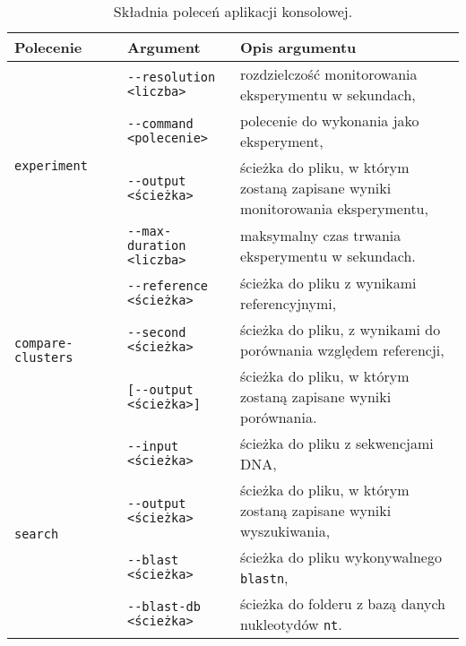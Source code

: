                 \begin{table}[!h] \centering
                    \caption{Składnia poleceń aplikacji konsolowej.}\label{Table:ConsoleCommandsSyntax}

                    \begin{tabular}{| p{0.25\linewidth} | >{\footnotesize}p{0.25\linewidth} | >{\footnotesize}p{0.5\linewidth} | } 
                        \hline
                        \textbf{Polecenie}     & \textbf{\normalsize Argument}    & \textbf{\normalsize Opis argumentu} \\ \hline\hline

                        \multirow{4}{*}{\texttt{experiment}}  & \texttt{-\phantom{}-resolution <liczba>}   & rozdzielczość monitorowania eksperymentu w sekundach, \\
                                                              & \texttt{-\phantom{}-command <polecenie>}   & polecenie do wykonania jako eksperyment, \\
                                                              & \texttt{-\phantom{}-output <ścieżka>}      & ścieżka do pliku, w którym zostaną zapisane wyniki monitorowania eksperymentu, \\
                                                              & \texttt{-\phantom{}-max-duration <liczba>} & maksymalny czas trwania eksperymentu w sekundach. \\ \hline

                            

                        \multirow{3}{*}{\texttt{compare-clusters}}  & \texttt{-\phantom{}-reference <ścieżka>} & ścieżka do pliku z wynikami referencyjnymi, \\
                                                                    & \texttt{-\phantom{}-second <ścieżka>}    & ścieżka do pliku, z wynikami do porównania względem referencji, \\
                                                                    & \texttt{[-\phantom{}-output <ścieżka>]}  & ścieżka do pliku, w którym zostaną zapisane wyniki porównania. \\ \hline

                        \multirow{4}{*}{\texttt{search}}    & \texttt{-\phantom{}-input <ścieżka>}    & ścieżka do pliku z sekwencjami DNA, \\
                                                            & \texttt{-\phantom{}-output <ścieżka>}   & ścieżka do pliku, w którym zostaną zapisane wyniki wyszukiwania, \\
                                                            & \texttt{-\phantom{}-blast <ścieżka>}    & ścieżka do pliku wykonywalnego \texttt{blastn}, \\
                                                            & \texttt{-\phantom{}-blast-db <ścieżka>} & ścieżka do folderu z bazą danych nukleotydów \texttt{nt}. \\ \hline


\end{tabular}
\end{table}
